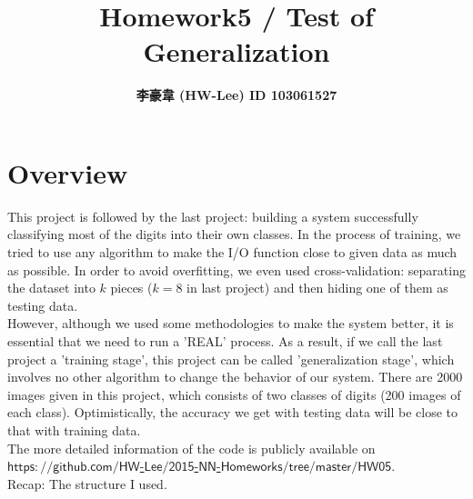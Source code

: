 \documentclass[12pt]{article}
\title{\textbf{Homework5 / Test of Generalization}}
\author{\textbf{李豪韋 (HW-Lee) ID 103061527}}
\date{}
\begin{document}
\vspace*{-60pt}
    {\let\newpage\relax\maketitle}

\section*{Overview}
\vspace{-20pt}
\noindent\makebox[\linewidth]{\rule{\textwidth}{0.4pt}}
\vspace{5pt}

This project is followed by the last project: building a  system successfully classifying most of the digits into their own classes. In the process of training, we tried to use any algorithm to make the I/O function close to given data as much as possible. In order to avoid overfitting, we even used cross-validation: separating the dataset into $k$ pieces ($k=8$ in last project) and then hiding one of them as testing data. \\

However, although we used some methodologies to make the system better, it is essential that we need to run a 'REAL' process. As a result, if we call  the last project a 'training stage', this project can be called 'generalization stage', which involves no other algorithm to change the behavior of our system. There are 2000 images given in this project, which consists of two classes of digits (200 images of each class). Optimistically, the accuracy we get with testing data will be close to that with training data. \\

The more detailed information of the code is publicly available on \href{https://github.com/HW-Lee/2015-NN-Homeworks/tree/master/HW05}{$\mathsf{https://github.com/HW}$-$\mathsf{Lee/2015}$-$\mathsf{NN}$-$\mathsf{Homeworks/tree/master/HW05}$}. \\

Recap: The structure I used.
\end{document}
